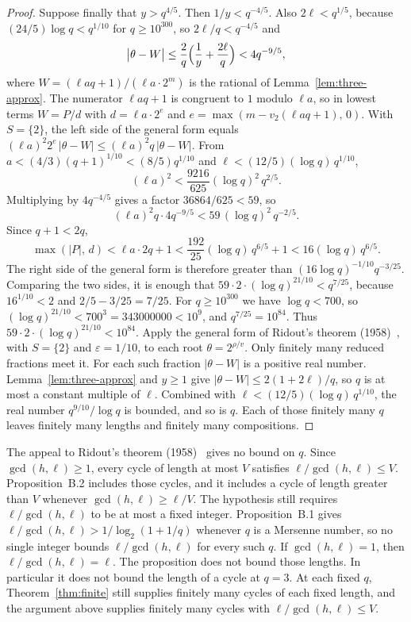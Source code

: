 \documentclass[11pt]{article}
\begin{document}
\begin{proof}
Suppose finally that $y > q^{4/5}$.
Then $1/y < q^{-4/5}$.
Also $2\ell < q^{1/5}$, because $(24/5)\log q < q^{1/10}$ for $q \ge 10^{300}$, so $2\ell/q < q^{-4/5}$ and
\[
\bigl|\theta - W\bigr| \le \frac{2}{q}\Bigl(\frac{1}{y} + \frac{2\ell}{q}\Bigr) < 4q^{-9/5},
\]
where $W = (\ell aq + 1)/(\ell a \cdot 2^m)$ is the rational of Lemma~\ref{lem:three-approx}.
The numerator $\ell aq + 1$ is congruent to $1$ modulo $\ell a$, so in lowest terms $W = P/d$ with $d = \ell a \cdot 2^e$ and $e = \max(m - v_2(\ell aq + 1),\, 0)$.
With $S = \{2\}$, the left side of the general form equals $(\ell a)^2 2^e\, |\theta - W| \le (\ell a)^2 q\, |\theta - W|$.
From $a < (4/3)(q+1)^{1/10} < (8/5)q^{1/10}$ and $\ell < (12/5)(\log q)\, q^{1/10}$,
\[
(\ell a)^2 < \frac{9216}{625}(\log q)^2\, q^{2/5}.
\]
Multiplying by $4q^{-4/5}$ gives a factor $36864/625 < 59$, so
\[
(\ell a)^2 q \cdot 4q^{-9/5} < 59\,(\log q)^2\, q^{-2/5}.
\]
Since $q+1 < 2q$,
\[
\max(|P|,\, d) < \ell a \cdot 2q + 1 < \frac{192}{25}(\log q)\, q^{6/5} + 1 < 16(\log q)\, q^{6/5}.
\]
The right side of the general form is therefore greater than $(16\log q)^{-1/10} q^{-3/25}$.
Comparing the two sides, it is enough that $59 \cdot 2 \cdot (\log q)^{21/10} < q^{7/25}$, because $16^{1/10} < 2$ and $2/5 - 3/25 = 7/25$.
For $q \ge 10^{300}$ we have $\log q < 700$, so $(\log q)^{21/10} < 700^3 = 343000000 < 10^9$, and $q^{7/25} = 10^{84}$.
Thus $59 \cdot 2 \cdot (\log q)^{21/10} < 10^{84}$.
Apply the general form of Ridout's theorem (1958)~\cite{ridout}, with $S = \{2\}$ and $\varepsilon = 1/10$, to each root $\theta = 2^{\rho/v}$.
Only finitely many reduced fractions meet it.
For each such fraction $|\theta - W|$ is a positive real number.
Lemma~\ref{lem:three-approx} and $y \ge 1$ give $|\theta - W| \le 2(1+2\ell)/q$, so $q$ is at most a constant multiple of $\ell$.
Combined with $\ell < (12/5)(\log q)\, q^{1/10}$, the real number $q^{9/10}/\log q$ is bounded, and so is $q$.
Each of those finitely many $q$ leaves finitely many lengths and finitely many compositions.
\end{proof}

The appeal to Ridout's theorem (1958)~\cite{ridout} gives no bound on $q$.
Since $\gcd(h,\ell) \ge 1$, every cycle of length at most $V$ satisfies $\ell/\gcd(h,\ell) \le V$.
Proposition~B.2 includes those cycles, and it includes a cycle of length greater than $V$ whenever $\gcd(h,\ell) \ge \ell/V$.
The hypothesis still requires $\ell/\gcd(h,\ell)$ to be at most a fixed integer.
Proposition~B.1 gives $\ell/\gcd(h,\ell) > 1/\log_2(1+1/q)$ whenever $q$ is a Mersenne number, so no single integer bounds $\ell/\gcd(h,\ell)$ for every such $q$.
If $\gcd(h,\ell) = 1$, then $\ell/\gcd(h,\ell) = \ell$.
The proposition does not bound those lengths.
In particular it does not bound the length of a cycle at $q = 3$.
At each fixed $q$, Theorem~\ref{thm:finite} still supplies finitely many cycles of each fixed length, and the argument above supplies finitely many cycles with $\ell/\gcd(h,\ell) \le V$.
\end{document}
